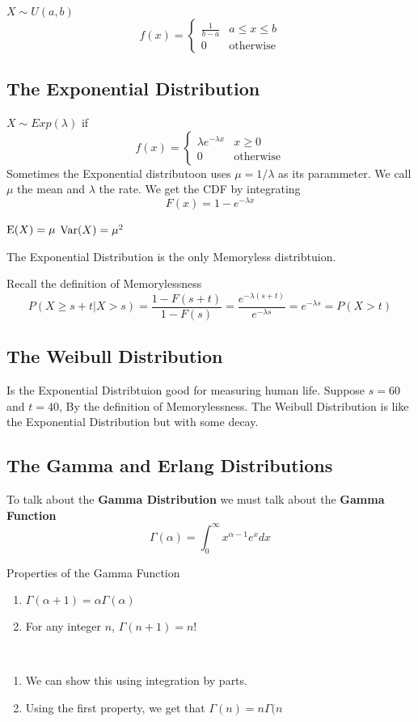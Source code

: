 \documentclass{report}
\begin{document}
$X\sim U(a,b)$
\[
    f(x)=\begin{cases}
        \frac 1 {b-a} & a\le x \le b \\
        0 & \text{otherwise}
    \end{cases}
\]



\subsection{The Exponential Distribution}
$X\sim Exp(\lambda)$ if
\[
    f(x)=\begin{cases}
        \lambda e^{-\lambda x} & x \ge 0
        \\
        0 & \text{otherwise}
    \end{cases}
\]
Sometimes the Exponential distributoon uses $\mu=1/\lambda $ as its parammeter. We call $\mu$ the mean and $\lambda $ the rate. We get the CDF by integrating
\[
    F(x)=1-e^{-\lambda x}
\]

$\textup{E}(X)=\mu$
$\textup{Var}(X)=\mu^2$

The Exponential Distribution is the only Memoryless distribtuion.

Recall the definition of Memorylessness
\[
    P(X\ge s+t| X>s)=\frac{1-F(s+t)}{1-F(s)}
    =\frac{e^{-\lambda (s+t)}}{e^{-\lambda s}}
    =e^{-\lambda s}
    =P(X>t)
\]

\subsection{The Weibull Distribution}
Is the Exponential Distribtuion good for measuring human life. Suppose $s=60$
 and $t=40$, By the definition of Memorylessness.
 The Weibull Distribution is like the Exponential Distribution but with some decay.
 
\subsection{The Gamma and Erlang Distributions}
To talk about the \textbf{Gamma Distribution} we must talk about the \textbf{Gamma Function}
\[
    \Gamma(\alpha)=\int_0^\infty x^{\alpha - 1} e^x dx
\]
\begin{theorem}
    {Properties of the Gamma Function}
    \begin{enumerate}
        \item $\Gamma(\alpha+1)=\alpha\Gamma(\alpha)$
        \item For any integer $n$, $\Gamma(n+1)=n!$
    \end{enumerate}
    \
    \begin{enumerate}
        \item We can show this using integration by parts.
        \item Using the first property, we get that $\Gamma(n)=n\Gamma(n$\todo
    \end{enumerate}
\end{theorem}
\end{document}
